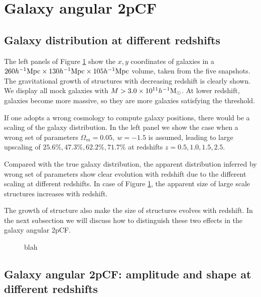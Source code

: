 \documentclass[iop]{emulateapj}
\newcommand{\hMsun}{{\ifmmode{h^{-1}{\rm
        {M_{\odot}}}}\else{$h^{-1}{\rm{M_{\odot}}}$~}\fi}}
\begin{document}
\section{Galaxy angular 2pCF}

\subsection{Galaxy distribution at different redshifts}

The left panels of Figure \ref{fig_scatter} show the $x,y$ coordinates of galaxies in a 
$260 h^{-1} {\rm Mpc} \times 130 h^{-1} {\rm Mpc} \times 105 h^{-1} {\rm Mpc}$ volume, 
taken from the five snapshots.
The gravitational growth of structures with decreasing redshift is clearly shown.
We display all mock galaxies with $M> 3.0 \times 10^{11} \hMsun$.
At lower redshift, galaxies become more massive, so they are more galaxies satisfying the threshold.

If one adopts a wrong cosmology to compute galaxy positions, there would be a scaling of the galaxy distribution.
In the left panel we show the case when a wrong set of parameters $\Omega_m=0.05,\ w=-1.5$ is assumed,
leading to large upscaling of $25.6\%,47.3\%,62.2\%,71.7\%$ at redshifts $z=0.5,1.0,1.5,2.5$.

Compared with the true galaxy distribution, the apparent distribution inferred by wrong set of parameters
show clear evolution with redshift due to the different scaling at different redshifts.
In case of Figure \ref{fig_scatter}, the apparent size of large scale structures increases with redshift.

The growth of structure also make the size of structures evolves with redshift.
In the next subsection we will discuss how to distinguish these two effects in the galaxy angular 2pCF.

\begin{figure}
   \caption{\label{fig_scatter}
  blah
   }
\end{figure}


\subsection{Galaxy angular 2pCF: amplitude and shape at different redshifts}
\end{document}
